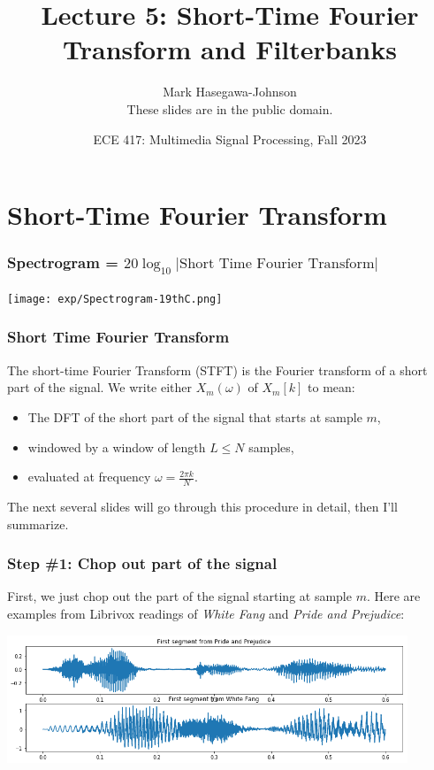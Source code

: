\documentclass{beamer}
\title{Lecture 5: Short-Time Fourier Transform and Filterbanks}
\author{Mark Hasegawa-Johnson\\These slides are in the public domain.}
\date{ECE 417: Multimedia Signal Processing, Fall 2023}
\begin{document}
\begin{frame}
  \maketitle
\end{frame}

\begin{frame}
  \tableofcontents
\end{frame}

\section[STFT]{Short-Time Fourier Transform}
\setcounter{subsection}{1}

\begin{frame}
  \frametitle{Spectrogram = $20\log_{10}|\mbox{Short Time Fourier Transform}|$}
  \centerline{\texttt{[image: exp/Spectrogram-19thC.png]}}
\end{frame}

\begin{frame}
  \frametitle{Short Time Fourier Transform}


  The short-time Fourier Transform (STFT) is the Fourier transform of
  a short part of the signal.
  We write either $X_m(\omega)$  of $X_m[k]$ to mean:
  \begin{itemize}
  \item The DFT of the short part of the signal that starts at sample $m$,
  \item windowed by a window of length $L\le N$ samples,
  \item evaluated at frequency $\omega=\frac{2\pi k}{N}$.
  \end{itemize}
  The next several slides will go through this procedure in detail,
  then I'll summarize.
\end{frame}

\begin{frame}
  \frametitle{Step \#1: Chop out part of the signal}

  First, we just chop out the part of the signal starting at sample
  $m$.  Here are examples from Librivox readings of {\em White Fang}
  and {\em Pride and Prejudice}:
  \centerline{\includegraphics[height=1.5in]{librivox_waves.png}}
\end{frame}
\end{document}
